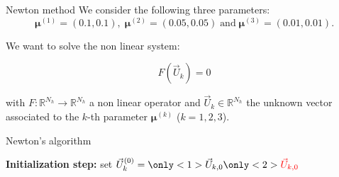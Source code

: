 \begin{frame}{Newton method}
	We consider the following three parameters:
	$$\bm{\mu}^{(1)} = (0.1,0.1), \; \bm{\mu}^{(2)} = (0.05,0.05) \; \text{and} \; \bm{\mu}^{(3)} = (0.01,0.01).$$

	We want to solve the non linear system: %

    \normalsize
    \vspace{-10pt}
    \begin{equation*}
        F(\vec{U}_k) = 0 
    \end{equation*}

    \vspace{-2pt}
    with $F:\mathbb{R}^{N_h} \to \mathbb{R}^{N_h}$ a non linear operator and $\vec{U}_k\in \mathbb{R}^{N_h}$ the unknown vector associated to the $k$-th parameter $\bm{\mu}^{(k)}$ ($k=1,2,3$).

	\setcounter{algocf}{0}
    \begin{center}
        \small
        \begin{minipage}{0.9\linewidth}
            \begin{algorithm}[H]
                \SetAlgoLined
                \caption{Newton's algorithm \citep{newton_accel_2025}}
                \textbf{Initialization step:} set $\vec{U}_k^{(0)} = \only<1>{\vec{U}_{k,0}}\only<2>{\textcolor{red}{\vec{U}_{k,0}}}$\;
            \end{algorithm}
        \end{minipage}
    \end{center}
\end{frame}

